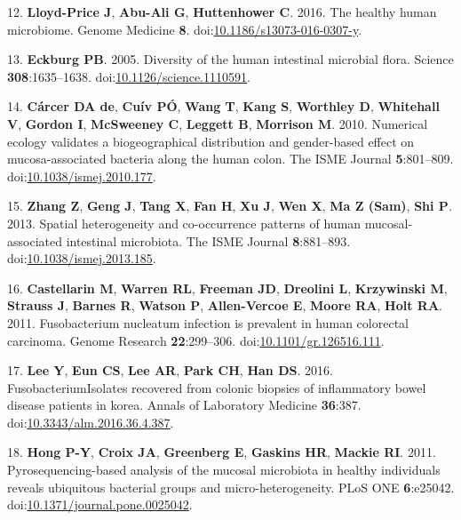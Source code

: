 \documentclass[11pt,]{article}
\begin{document}
\hypertarget{ref-LloydPrice2016}{}
12. \textbf{Lloyd-Price J}, \textbf{Abu-Ali G}, \textbf{Huttenhower C}.
2016. The healthy human microbiome. Genome Medicine \textbf{8}.
doi:\href{https://doi.org/10.1186/s13073-016-0307-y}{10.1186/s13073-016-0307-y}.

\hypertarget{ref-Eckburg2005}{}
13. \textbf{Eckburg PB}. 2005. Diversity of the human intestinal
microbial flora. Science \textbf{308}:1635--1638.
doi:\href{https://doi.org/10.1126/science.1110591}{10.1126/science.1110591}.

\hypertarget{ref-deCarcer2010}{}
14. \textbf{Cárcer DA de}, \textbf{Cuív PÓ}, \textbf{Wang T},
\textbf{Kang S}, \textbf{Worthley D}, \textbf{Whitehall V},
\textbf{Gordon I}, \textbf{McSweeney C}, \textbf{Leggett B},
\textbf{Morrison M}. 2010. Numerical ecology validates a biogeographical
distribution and gender-based effect on mucosa-associated bacteria along
the human colon. The ISME Journal \textbf{5}:801--809.
doi:\href{https://doi.org/10.1038/ismej.2010.177}{10.1038/ismej.2010.177}.

\hypertarget{ref-Zhang2013}{}
15. \textbf{Zhang Z}, \textbf{Geng J}, \textbf{Tang X}, \textbf{Fan H},
\textbf{Xu J}, \textbf{Wen X}, \textbf{Ma Z (Sam)}, \textbf{Shi P}.
2013. Spatial heterogeneity and co-occurrence patterns of human
mucosal-associated intestinal microbiota. The ISME Journal
\textbf{8}:881--893.
doi:\href{https://doi.org/10.1038/ismej.2013.185}{10.1038/ismej.2013.185}.

\hypertarget{ref-Castellarin2011}{}
16. \textbf{Castellarin M}, \textbf{Warren RL}, \textbf{Freeman JD},
\textbf{Dreolini L}, \textbf{Krzywinski M}, \textbf{Strauss J},
\textbf{Barnes R}, \textbf{Watson P}, \textbf{Allen-Vercoe E},
\textbf{Moore RA}, \textbf{Holt RA}. 2011. Fusobacterium nucleatum
infection is prevalent in human colorectal carcinoma. Genome Research
\textbf{22}:299--306.
doi:\href{https://doi.org/10.1101/gr.126516.111}{10.1101/gr.126516.111}.

\hypertarget{ref-Lee2016}{}
17. \textbf{Lee Y}, \textbf{Eun CS}, \textbf{Lee AR}, \textbf{Park CH},
\textbf{Han DS}. 2016. FusobacteriumIsolates recovered from colonic
biopsies of inflammatory bowel disease patients in korea. Annals of
Laboratory Medicine \textbf{36}:387.
doi:\href{https://doi.org/10.3343/alm.2016.36.4.387}{10.3343/alm.2016.36.4.387}.

\hypertarget{ref-Hong2011}{}
18. \textbf{Hong P-Y}, \textbf{Croix JA}, \textbf{Greenberg E},
\textbf{Gaskins HR}, \textbf{Mackie RI}. 2011. Pyrosequencing-based
analysis of the mucosal microbiota in healthy individuals reveals
ubiquitous bacterial groups and micro-heterogeneity. PLoS ONE
\textbf{6}:e25042.
doi:\href{https://doi.org/10.1371/journal.pone.0025042}{10.1371/journal.pone.0025042}.
\end{document}
